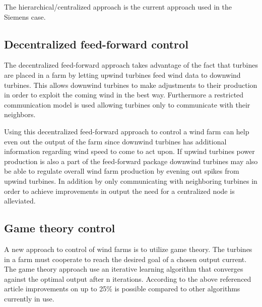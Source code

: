 The hierarchical/centralized approach is the current approach used in the Siemens case.

\subsection{Decentralized feed-forward control}
The decentralized feed-forward approach\cite{DecentralisedFeedforwardControlOfWindFarms} takes advantage of the fact that turbines are placed in a farm by letting upwind turbines feed wind data to downwind turbines. 
This allows downwind turbines to make adjustments to their production in order to exploit the coming wind in the best way.
Furthermore a restricted communication model is used allowing turbines only to communicate with their neighbors.

Using this decentralized feed-forward approach to control a wind farm can help even out the output of the farm since downwind turbines has additional information regarding wind speed to come to act upon. If upwind turbines power production is also a part of the feed-forward package downwind turbines may also be able to regulate overall wind farm production by evening out spikes from upwind turbines.
In addition by only communicating with neighboring turbines in order to achieve improvements in output the need for a centralized node is alleviated.

\subsection{Game theory control}
A new approach to control of wind farms is to utilize game theory\cite{AModelFreeApproachToWindFarmControl}.
The turbines in a farm must cooperate to reach the desired goal of a chosen output current.
The game theory approach use an iterative learning algorithm that converges against the optimal output after n iterations.
According to the above referenced article improvements on up to 25\% is possible compared to other algorithms currently in use.